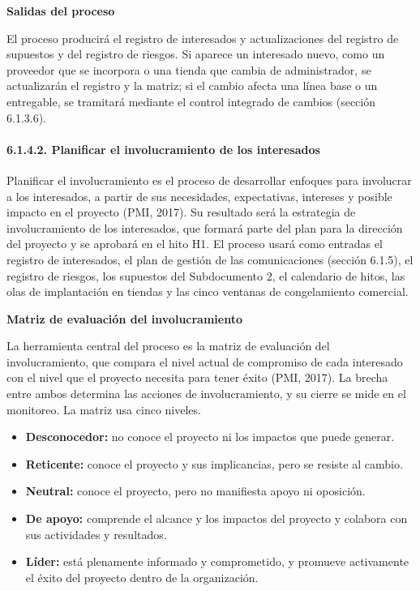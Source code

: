 \documentclass[11pt]{article}
\begin{document}
\textbf{Salidas del proceso}

El proceso producirá el registro de interesados y actualizaciones del
registro de supuestos y del registro de riesgos. Si aparece un
interesado nuevo, como un proveedor que se incorpora o una tienda que
cambia de administrador, se actualizarán el registro y la matriz; si el
cambio afecta una línea base o un entregable, se tramitará mediante el
control integrado de cambios (sección 6.1.3.6).

\paragraph{6.1.4.2. Planificar el involucramiento de los interesados}\label{6-1-4-2-planificar-el-involucramiento-de-los-interesados}

Planificar el involucramiento es el proceso de desarrollar enfoques para involucrar a los interesados, a partir de sus necesidades, expectativas, intereses y posible impacto en el proyecto (PMI, 2017). Su resultado será la estrategia de involucramiento de los interesados, que formará parte del plan para la dirección del proyecto y se aprobará en el hito H1. El proceso usará como entradas el registro de interesados, el plan de gestión de las comunicaciones (sección 6.1.5), el registro de riesgos, los supuestos del Subdocumento 2, el calendario de hitos, las olas de implantación en tiendas y las cinco ventanas de congelamiento comercial.

\textbf{Matriz de evaluación del involucramiento}

La herramienta central del proceso es la matriz de evaluación del
involucramiento, que compara el nivel actual de compromiso de cada
interesado con el nivel que el proyecto necesita para tener éxito (PMI,
2017). La brecha entre ambos determina las acciones de involucramiento,
y su cierre se mide en el monitoreo. La matriz usa cinco niveles.

\begin{itemize}
\item
  \textbf{Desconocedor:} no conoce el proyecto ni los impactos que puede
  generar.
\item
  \textbf{Reticente:} conoce el proyecto y sus implicancias, pero se
  resiste al cambio.
\item
  \textbf{Neutral:} conoce el proyecto, pero no manifiesta apoyo ni
  oposición.
\item
  \textbf{De apoyo:} comprende el alcance y los impactos del proyecto y
  colabora con sus actividades y resultados.
\item
  \textbf{Líder:} está plenamente informado y comprometido, y promueve
  activamente el éxito del proyecto dentro de la organización.
\end{itemize}
\end{document}
